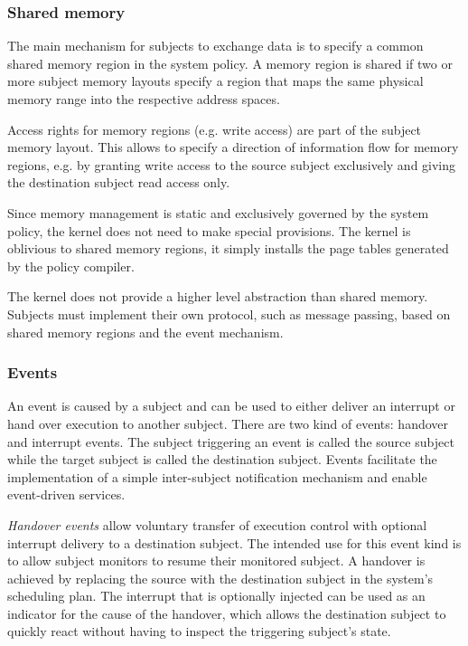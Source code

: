 \subsubsection{Shared memory}
The main mechanism for subjects to exchange data is to specify a common shared
memory region in the system policy. A memory region is shared if two or more
subject memory layouts specify a region that maps the same physical memory range
into the respective address spaces.

Access rights for memory regions (e.g. write access) are part of the subject
memory layout. This allows to specify a direction of information flow for memory
regions, e.g. by granting write access to the source subject exclusively and
giving the destination subject read access only.

Since memory management is static and exclusively governed by the system policy,
the kernel does not need to make special provisions. The kernel is oblivious to
shared memory regions, it simply installs the page tables generated by the
policy compiler.

The kernel does not provide a higher level abstraction than shared memory.
Subjects must implement their own protocol, such as message passing, based on
shared memory regions and the event mechanism.

\subsubsection{Events}\label{subsubsec:events}
An event is caused by a subject and can be used to either deliver an interrupt
or hand over execution to another subject. There are two kind of events:
handover and interrupt events. The subject triggering an event is called the
source subject while the target subject is called the destination subject.
Events facilitate the implementation of a simple inter-subject notification
mechanism and enable event-driven services.

\emph{Handover events} allow voluntary transfer of execution control with
optional interrupt delivery to a destination subject. The intended use for this
event kind is to allow subject monitors to resume their monitored subject. A
handover is achieved by replacing the source with the destination subject in the
system's scheduling plan. The interrupt that is optionally injected can be used
as an indicator for the cause of the handover, which allows the destination
subject to quickly react without having to inspect the triggering subject's
state.

